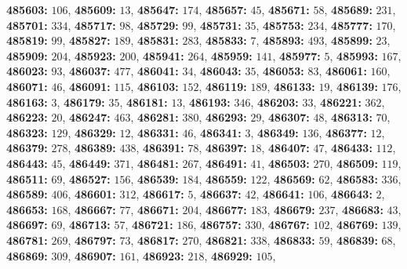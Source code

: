 \textsf{\bfseries 485603:} $106$, \textsf{\bfseries 485609:} $13$, \textsf{\bfseries 485647:} $174$, \textsf{\bfseries 485657:} $45$, \textsf{\bfseries 485671:} $58$, \textsf{\bfseries 485689:} $231$, \textsf{\bfseries 485701:} $334$, \textsf{\bfseries 485717:} $98$, \textsf{\bfseries 485729:} $99$, \textsf{\bfseries 485731:} $35$, \textsf{\bfseries 485753:} $234$, \textsf{\bfseries 485777:} $170$, \textsf{\bfseries 485819:} $99$, \textsf{\bfseries 485827:} $189$, \textsf{\bfseries 485831:} $283$, \textsf{\bfseries 485833:} $7$, \textsf{\bfseries 485893:} $493$, \textsf{\bfseries 485899:} $23$, \textsf{\bfseries 485909:} $204$, \textsf{\bfseries 485923:} $200$, \textsf{\bfseries 485941:} $264$, \textsf{\bfseries 485959:} $141$, \textsf{\bfseries 485977:} $5$, \textsf{\bfseries 485993:} $167$, \textsf{\bfseries 486023:} $93$, \textsf{\bfseries 486037:} $477$, \textsf{\bfseries 486041:} $34$, \textsf{\bfseries 486043:} $35$, \textsf{\bfseries 486053:} $83$, \textsf{\bfseries 486061:} $160$, \textsf{\bfseries 486071:} $46$, \textsf{\bfseries 486091:} $115$, \textsf{\bfseries 486103:} $152$, \textsf{\bfseries 486119:} $189$, \textsf{\bfseries 486133:} $19$, \textsf{\bfseries 486139:} $176$, \textsf{\bfseries 486163:} $3$, \textsf{\bfseries 486179:} $35$, \textsf{\bfseries 486181:} $13$, \textsf{\bfseries 486193:} $346$, \textsf{\bfseries 486203:} $33$, \textsf{\bfseries 486221:} $362$, \textsf{\bfseries 486223:} $20$, \textsf{\bfseries 486247:} $463$, \textsf{\bfseries 486281:} $380$, \textsf{\bfseries 486293:} $29$, \textsf{\bfseries 486307:} $48$, \textsf{\bfseries 486313:} $70$, \textsf{\bfseries 486323:} $129$, \textsf{\bfseries 486329:} $12$, \textsf{\bfseries 486331:} $46$, \textsf{\bfseries 486341:} $3$, \textsf{\bfseries 486349:} $136$, \textsf{\bfseries 486377:} $12$, \textsf{\bfseries 486379:} $278$, \textsf{\bfseries 486389:} $438$, \textsf{\bfseries 486391:} $78$, \textsf{\bfseries 486397:} $18$, \textsf{\bfseries 486407:} $47$, \textsf{\bfseries 486433:} $112$, \textsf{\bfseries 486443:} $45$, \textsf{\bfseries 486449:} $371$, \textsf{\bfseries 486481:} $267$, \textsf{\bfseries 486491:} $41$, \textsf{\bfseries 486503:} $270$, \textsf{\bfseries 486509:} $119$, \textsf{\bfseries 486511:} $69$, \textsf{\bfseries 486527:} $156$, \textsf{\bfseries 486539:} $184$, \textsf{\bfseries 486559:} $122$, \textsf{\bfseries 486569:} $62$, \textsf{\bfseries 486583:} $336$, \textsf{\bfseries 486589:} $406$, \textsf{\bfseries 486601:} $312$, \textsf{\bfseries 486617:} $5$, \textsf{\bfseries 486637:} $42$, \textsf{\bfseries 486641:} $106$, \textsf{\bfseries 486643:} $2$, \textsf{\bfseries 486653:} $168$, \textsf{\bfseries 486667:} $77$, \textsf{\bfseries 486671:} $204$, \textsf{\bfseries 486677:} $183$, \textsf{\bfseries 486679:} $237$, \textsf{\bfseries 486683:} $43$, \textsf{\bfseries 486697:} $69$, \textsf{\bfseries 486713:} $57$, \textsf{\bfseries 486721:} $186$, \textsf{\bfseries 486757:} $330$, \textsf{\bfseries 486767:} $102$, \textsf{\bfseries 486769:} $139$, \textsf{\bfseries 486781:} $269$, \textsf{\bfseries 486797:} $73$, \textsf{\bfseries 486817:} $270$, \textsf{\bfseries 486821:} $338$, \textsf{\bfseries 486833:} $59$, \textsf{\bfseries 486839:} $68$, \textsf{\bfseries 486869:} $309$, \textsf{\bfseries 486907:} $161$, \textsf{\bfseries 486923:} $218$, \textsf{\bfseries 486929:} $105$, 
